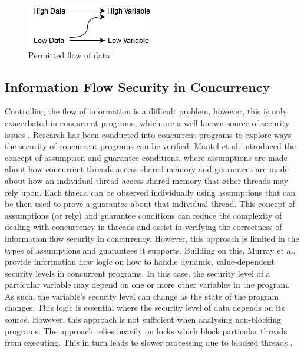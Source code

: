 \documentclass[twocolumn]{article}
\begin{document}
\begin{figure}
    \label{fig:flow}
    \includegraphics{flow.png}
    \caption{Permitted flow of data}
\end{figure}

\subsection{Information Flow Security in Concurrency}
Controlling the flow of information is a difficult problem, however, this is only exacerbated in concurrent programs, which are a well known source of security issues \cite{mantel2014noninterference}\cite{smith2019value}\cite{vaughan2012secure}. Research has been conducted into concurrent programs to explore ways the security of concurrent programs can be verified. Mantel et al. \cite{mantel2011assumptions} introduced the concept of assumption and guarantee conditions, where assumptions are made about how concurrent threads access shared memory and guarantees are made about how an individual thread access shared memory that other threads may rely upon. Each thread can be observed individually using assumptions that can be then used to prove a guarantee about that individual thread. This concept of assumptions (or rely) and guarantee conditions can reduce the complexity of dealing with concurrency in threads and assist in verifying the correctness of information flow security in concurrency. However, this approach is limited in the types of assumptions and guarantees it supports. Building on this, Murray et al. \cite{ernst2019seccsl} \cite{murray2018covern} provide information flow logic on how to handle dynamic, value-dependent security levels in concurrent programs. In this case, the security level of a particular variable may depend on one or more other variables in the program. As such, the variable's security level can change as the state of the program changes. This logic is essential where the security level of data depends on its source. However, this approach is not sufficient when analysing non-blocking programs. The approach relies heavily on locks which block particular threads from executing. This in turn leads to slower processing due to blocked threads \cite{prakash1991non}.
\end{document}
